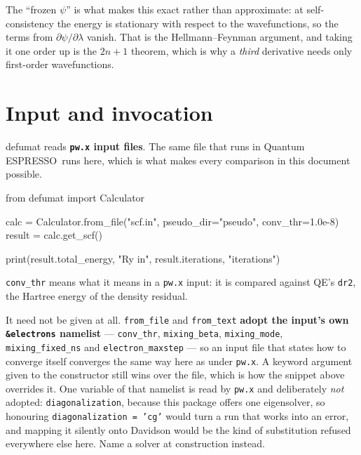 \documentclass[11pt,a4paper]{article}
\newcommand{\qe}{Quantum ESPRESSO}
\newcommand{\code}[1]{\texttt{\small #1}}
\begin{document}
The ``frozen $\psi$'' is what makes this exact rather than approximate: at
self-consistency the energy is stationary with respect to the wavefunctions, so
the terms from $\partial\psi/\partial\lambda$ vanish. That is the
Hellmann--Feynman argument, and taking it one order up is the $2n{+}1$ theorem,
which is why a \emph{third} derivative needs only first-order wavefunctions.

\clearpage
\tableofcontents
\clearpage

\section{Input and invocation}

defumat reads \textbf{\code{pw.x} input files}. The same file that runs in
\qe\ runs here, which is what makes every comparison in this document possible.

\begin{pycode}
from defumat import Calculator

calc = Calculator.from_file("scf.in", pseudo_dir="pseudo", conv_thr=1.0e-8)
result = calc.get_scf()

print(result.total_energy, "Ry in", result.iterations, "iterations")
\end{pycode}

\code{conv\_thr} means what it means in a \code{pw.x} input: it is compared
against QE's \code{dr2}, the Hartree energy of the density residual.

It need not be given at all. \code{from\_file} and \code{from\_text}
\textbf{adopt the input's own \code{\&electrons} namelist} ---
\code{conv\_thr}, \code{mixing\_beta}, \code{mixing\_mode},
\code{mixing\_fixed\_ns} and \code{electron\_maxstep} --- so an input file
that states how to converge itself converges the same way here as under
\code{pw.x}. A keyword argument given to the constructor still wins over the
file, which is how the snippet above overrides it. One variable of that
namelist is read by \code{pw.x} and deliberately \emph{not} adopted:
\code{diagonalization}, because this package offers one eigensolver, so
honouring \code{diagonalization = 'cg'} would turn a run that works into an
error, and mapping it silently onto Davidson would be the kind of substitution
refused everywhere else here. Name a solver at construction instead.
\end{document}
